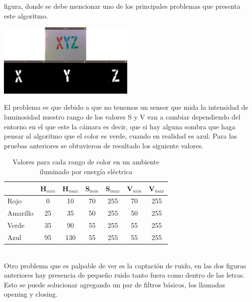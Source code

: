 figura, donde se debe mencionar uno de los principales problemas que presenta este algoritmo.
\begin{center}
	\includegraphics[width=0.5\textwidth]{Contenido/Cuerpo/Capitulo4/Fig8.eps}
	\label{Fig9}
\end{center}
El problema es que debido a que no tenemos un sensor que mida la intensidad de luminosidad
nuestro rango de los valores S y V van a cambiar dependiendo del entorno en el que este la cámara
es decir, que si hay alguna sombra que haga pensar al algoritmo que el color es verde, cuando en
realidad es azul.
Para las pruebas anteriores se obtuvieron de resultado los siguiente valores.\\
\begin{table}[ht]
	\begin{center}
		\caption{Valores para cada rango de color en un ambiente iluminado por energía eléctrica}
		\begin{tabular}[t]{lcccccc}
			\hline
			         & H$_{min}$ & H$_{max}$ & S$_{min}$ & S$_{max}$ & V$_{min}$ & V$_{max}$ \\
			\hline
			Rojo     & 0         & 10        & 70        & 255       & 70        & 255       \\
			Amarillo & 25        & 35        & 50        & 255       & 50        & 255       \\
			Verde    & 35        & 90        & 55        & 255       & 55        & 255       \\
			Azul     & 95        & 130       & 55        & 255       & 55        & 255       \\
			\hline
		\end{tabular}
	\end{center}
\end{table}\\
Otro problema que es palpable de ver es la captación de ruido, en las dos figuras anteriores
hay presencia de pequeño ruido tanto fuera como dentro de las letras. Esto se puede solucionar
agregando un par de filtros básicos, los llamadas opening y closing.

